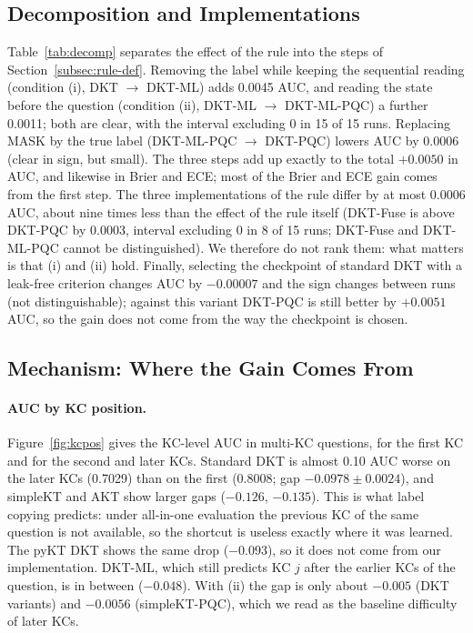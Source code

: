 \subsection{Decomposition and Implementations}
\label{subsec:res-decomp}

\begin{table}[tbp]
  \caption{Paired bootstrap differences $b-a$ on DKT (AUC: mean [min; max] over 15 runs; CI: runs with CI above 0 / below 0; Brier and ECE: mean). Bold: clear difference.}
  \label{tab:decomp}
  \centering
  \scriptsize
  \setlength{\tabcolsep}{3pt}
  \resizebox{\textwidth}{!}{%
  }
\end{table}

Table~\ref{tab:decomp} separates the effect of the rule into the steps of Section~\ref{subsec:rule-def}.
Removing the label while keeping the sequential reading (condition (i), DKT $\to$ DKT-ML) adds 0.0045 AUC, and reading the state before the question (condition (ii), DKT-ML $\to$ DKT-ML-PQC) a further 0.0011; both are clear, with the interval excluding 0 in 15 of 15 runs.
Replacing MASK by the true label (DKT-ML-PQC $\to$ DKT-PQC) lowers AUC by 0.0006 (clear in sign, but small). The three steps add up exactly to the total $+0.0050$ in AUC, and likewise in Brier and ECE; most of the Brier and ECE gain comes from the first step.
The three implementations of the rule differ by at most 0.0006 AUC, about nine times less than the effect of the rule itself (DKT-Fuse is above DKT-PQC by 0.0003, interval excluding 0 in 8 of 15 runs; DKT-Fuse and DKT-ML-PQC cannot be distinguished).
We therefore do not rank them: what matters is that (i) and (ii) hold.
Finally, selecting the checkpoint of standard DKT with a leak-free criterion changes AUC by $-0.00007$ and the sign changes between runs (not distinguishable); against this variant DKT-PQC is still better by $+0.0051$ AUC, so the gain does not come from the way the checkpoint is chosen.

\subsection{Mechanism: Where the Gain Comes From}
\label{subsec:res-mech}

\paragraph{AUC by KC position.}
Figure~\ref{fig:kcpos} gives the KC-level AUC in multi-KC questions, for the first KC and for the second and later KCs.
Standard DKT is almost 0.10 AUC worse on the later KCs (0.7029) than on the first (0.8008; gap $-0.0978\pm0.0024$), and simpleKT and AKT show larger gaps ($-0.126$, $-0.135$).
This is what label copying predicts: under all-in-one evaluation the previous KC of the same question is not available, so the shortcut is useless exactly where it was learned.
The pyKT DKT shows the same drop ($-0.093$), so it does not come from our implementation.
DKT-ML, which still predicts KC $j$ after the earlier KCs of the question, is in between ($-0.048$).
With (ii) the gap is only about $-0.005$ (DKT variants) and $-0.0056$ (simpleKT-PQC), which we read as the baseline difficulty of later KCs.

